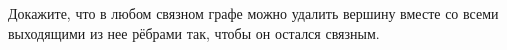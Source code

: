 Докажите, что в любом связном графе можно удалить вершину вместе со всеми выходящими из нее рёбрами так, чтобы он остался связным.